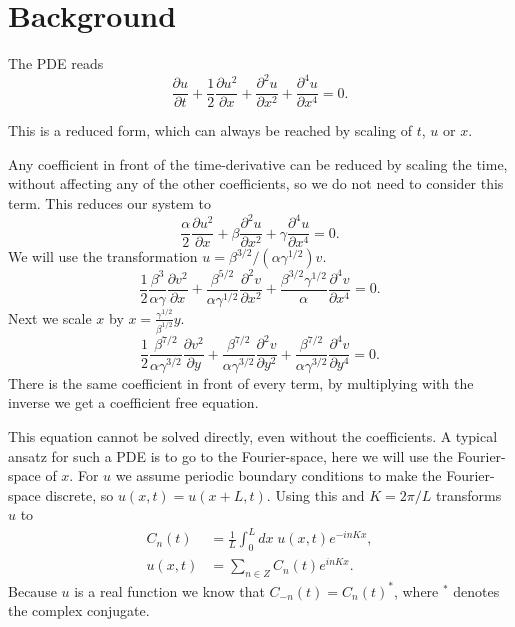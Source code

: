 \section{Background}
The PDE reads~\cite{ruyer-quil2014dynamics}
\begin{equation}
  \frac{\partial u }{\partial t} + \frac{1}{2} \frac{\partial u^2 }{\partial x} + \frac{\partial^2 u }{\partial x^2} + \frac{\partial^4 u }{\partial x^4} = 0.\label{eq:PDE}
\end{equation}

This is a reduced form, which can always be reached by scaling of $t$, $u$ or $x$.

Any coefficient in front of the time-derivative can be reduced by scaling the time, without affecting any of the other coefficients, so we do not need to consider this term. This reduces our system to
\begin{equation}
  \frac{\alpha}{2} \frac{\partial u^2 }{\partial x} + \beta \frac{\partial^2 u }{\partial x^2} + \gamma \frac{\partial^4 u }{\partial x^4} = 0.
\end{equation}
We will use the transformation $ u =\beta^{3/2}/(\alpha \gamma^{1/2}) v $.
\begin{equation}
  \frac{1}{2} \frac{\beta^3}{\alpha \gamma} \frac{\partial v^2 }{\partial x} + \frac{\beta^{5/2}}{\alpha \gamma^{1/2}} \frac{\partial^2 v }{\partial x^2} + \frac{\beta^{3/2} \gamma^{1/2}}{\alpha} \frac{\partial^4 v }{\partial x^4} = 0.
\end{equation}
Next we scale $x$ by $ x = \frac{\gamma^{1/2}}{\beta^{1/2}} y $.
\begin{equation}
  \frac{1}{2} \frac{\beta^{7/2}}{\alpha \gamma^{3/2}} \frac{\partial v^2 }{\partial y} + \frac{\beta^{7/2}}{\alpha \gamma^{3/2}} \frac{\partial^2 v }{\partial y^2} + \frac{\beta^{7/2}}{\alpha \gamma^{3/2}} \frac{\partial^4 v }{\partial y^4} = 0.
\end{equation}
There is the same coefficient in front of every term, by multiplying with the inverse we get a coefficient free equation.

This equation cannot be solved directly, even without the coefficients. A typical ansatz for such a PDE is to go to the Fourier-space, here we will use the Fourier-space of $x$. For $u$ we assume periodic boundary conditions to make the Fourier-space discrete, so $ u(x, t) = u(x + L, t) $. Using this and $ K = 2 \pi/L $ transforms $u$ to
\begin{align}
  C_n(t) & = \frac{1}{L} \int_0^L dx \; u(x,t) e^{-in K x}, \\
  u(x, t) & = \sum_{n \in Z} C_n (t) e^{in K x}. \label{eq:inverse}
\end{align}
Because $u$ is a real function we know that $C_{-n}(t) = {C_n(t)}^{*}$, where $^*$ denotes the complex conjugate.

